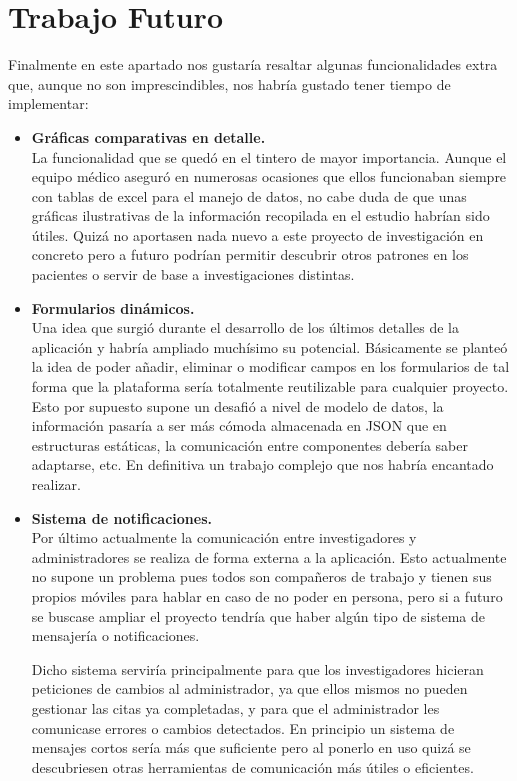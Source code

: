      \section{Trabajo Futuro}
     
      Finalmente en este apartado nos gustaría resaltar algunas funcionalidades extra que, aunque no son imprescindibles, nos habría gustado tener tiempo de implementar:
 \newline
 
 \begin{itemize}
  \item\textbf{Gráficas comparativas en detalle.} \\
  La funcionalidad que se quedó en el tintero de mayor importancia. Aunque el equipo médico aseguró en numerosas ocasiones que ellos funcionaban siempre con tablas de excel para el manejo de datos, no cabe duda de que unas gráficas ilustrativas de la información recopilada en el estudio habrían sido útiles. Quizá no aportasen nada nuevo a este proyecto de investigación en concreto pero a futuro podrían permitir descubrir otros patrones en los pacientes o servir de base a investigaciones distintas. \\
  
  \item\textbf{Formularios dinámicos.} \\
  Una idea que surgió durante el desarrollo de los últimos detalles de la aplicación y habría ampliado muchísimo su potencial. Básicamente se planteó la idea de poder añadir, eliminar o modificar campos en los formularios de tal forma que la plataforma sería totalmente reutilizable para cualquier proyecto. Esto por supuesto supone un desafió a nivel de modelo de datos, la información pasaría a ser más cómoda almacenada en JSON que en estructuras estáticas, la comunicación entre componentes debería saber adaptarse, etc. En definitiva un trabajo complejo que nos habría encantado realizar. \\
  
  \item\textbf{Sistema de notificaciones.} \\
  Por último actualmente la comunicación entre investigadores y administradores se realiza de forma externa a la aplicación. Esto actualmente no supone un problema pues todos son compañeros de trabajo y tienen sus propios móviles para hablar en caso de no poder en persona, pero si a futuro se buscase ampliar el proyecto tendría que haber algún tipo de sistema de mensajería o notificaciones. 
  \newline
  
  Dicho sistema serviría principalmente para que los investigadores hicieran peticiones de cambios al administrador, ya que ellos mismos no pueden gestionar las citas ya completadas, y para que el administrador les comunicase errores o cambios detectados. En principio un sistema de mensajes cortos sería más que suficiente pero al ponerlo en uso quizá se descubriesen otras herramientas de comunicación más útiles o eficientes. \\

\end{itemize}